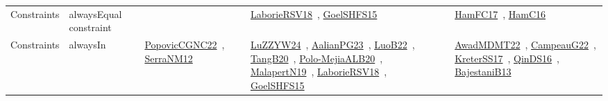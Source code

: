 {\begin{longtable}{lp{3cm}>{\raggedright\arraybackslash}p{6cm}>{\raggedright\arraybackslash}p{6cm}>{\raggedright\arraybackslash}p{8cm}}
Constraints & alwaysEqual constraint &  & \href{../works/LaborieRSV18.pdf}{LaborieRSV18}~\cite{LaborieRSV18}, \href{../works/GoelSHFS15.pdf}{GoelSHFS15}~\cite{GoelSHFS15} & \href{../works/HamFC17.pdf}{HamFC17}~\cite{HamFC17}, \href{../works/HamC16.pdf}{HamC16}~\cite{HamC16}\\
Constraints & alwaysIn & \href{../works/PopovicCGNC22.pdf}{PopovicCGNC22}~\cite{PopovicCGNC22}, \href{../works/SerraNM12.pdf}{SerraNM12}~\cite{SerraNM12} & \href{../works/LuZZYW24.pdf}{LuZZYW24}~\cite{LuZZYW24}, \href{../works/AalianPG23.pdf}{AalianPG23}~\cite{AalianPG23}, \href{../works/LuoB22.pdf}{LuoB22}~\cite{LuoB22}, \href{../works/TangB20.pdf}{TangB20}~\cite{TangB20}, \href{../works/Polo-MejiaALB20.pdf}{Polo-MejiaALB20}~\cite{Polo-MejiaALB20}, \href{../works/MalapertN19.pdf}{MalapertN19}~\cite{MalapertN19}, \href{../works/LaborieRSV18.pdf}{LaborieRSV18}~\cite{LaborieRSV18}, \href{../works/GoelSHFS15.pdf}{GoelSHFS15}~\cite{GoelSHFS15} & \href{../works/AwadMDMT22.pdf}{AwadMDMT22}~\cite{AwadMDMT22}, \href{../works/CampeauG22.pdf}{CampeauG22}~\cite{CampeauG22}, \href{../works/KreterSS17.pdf}{KreterSS17}~\cite{KreterSS17}, \href{../works/QinDS16.pdf}{QinDS16}~\cite{QinDS16}, \href{../works/BajestaniB13.pdf}{BajestaniB13}~\cite{BajestaniB13}\\

\end{longtable}}
